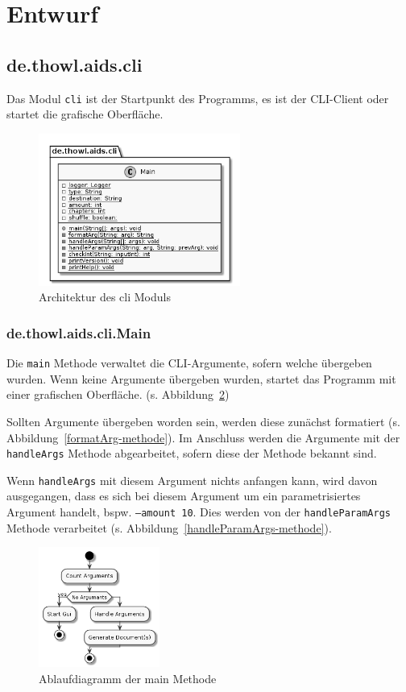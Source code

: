 \documentclass[stu, a4paper, 11pt, floatsintext]{apa7}
\begin{document}
\clearpage

\section{Entwurf}

\subsection{de.thowl.aids.cli}
\noindent Das Modul \texttt{cli} ist der Startpunkt des Programms, es ist der CLI-Client oder startet die grafische Oberfläche.

\begin{figure}[!htbp]
\centering
\includegraphics[width=250px]{../technical_documentation/diagramm/uml/flowcharts/cli/cli.png}
\caption{\label{CLI Architektur}Architektur des cli Moduls}
\end{figure}

\subsubsection{de.thowl.aids.cli.Main}
\noindent Die \texttt{main} Methode verwaltet die CLI-Argumente, sofern welche übergeben wurden.
Wenn keine Argumente übergeben wurden, startet das Programm mit einer grafischen Oberfläche. (s. Abbildung~\ref{main-methode})

Sollten Argumente übergeben worden sein, werden diese zunächst formatiert (s. Abbildung~\ref{formatArg-methode}).
Im Anschluss werden die Argumente mit der \texttt{handleArgs} Methode abgearbeitet, sofern diese der Methode bekannt sind.

Wenn \texttt{handleArgs} mit diesem Argument nichts anfangen kann, wird davon ausgegangen, dass es sich bei diesem Argument um ein parametrisiertes Argument handelt, bspw. \texttt{--amount 10}. Dies werden von der \texttt{handleParamArgs} Methode verarbeitet (s. Abbildung~\ref{handleParamArgs-methode}).

\begin{figure}[!htbp]
\centering
\includegraphics[width=150px]{../technical_documentation/diagramm/uml/flowcharts/cli/Main.png}
\caption{\label{main-methode}Ablaufdiagramm der main Methode}
\end{figure}
\end{document}
